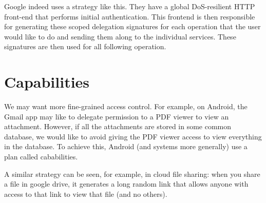 Google indeed uses a strategy like this. They have a global DoS-resilient HTTP front-end that performs initial authentication. This frontend is then responsible for generating these scoped delegation signatures for each operation that the user would like to do and sending them along to the individual services. These signatures are then used for all following operation.

\section{Capabilities}
We may want more fine-grained access control. For example, on Android, the Gmail app may like to delegate permission to a PDF viewer to view an attachment. However, if all the attachments are stored in some common database, we would like to avoid giving the PDF viewer access to view everything in the database. To achieve this, Android (and systems more generally) use a plan called cababilities.

A similar strategy can be seen, for example, in cloud file sharing: when you share a file in google drive, it generates a long random link that allows anyone with access to that link to view that file (and no others).

